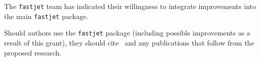 \documentclass[times,11pt]{article}
\begin{document}
The {\tt fastjet} team has indicated their willingness to integrate
improvements into the main {\tt fastjet} package. 


Should authors use the {\tt fastjet} package (including possible
improvements as a result of this grant), they should
cite~\cite{fastjet_timing,fastjet_manual} and any publications that
follow from the proposed research. 
\end{document}
